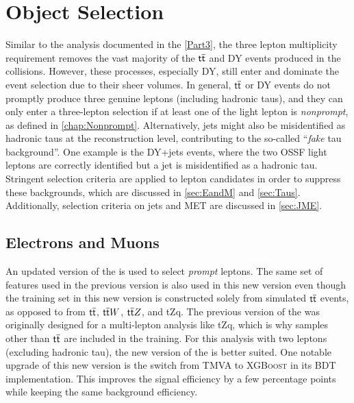 \chapter{Object Selection}
\label{chap:Obj}

Similar to the analysis documented in the \autoref{Part3}, the three lepton multiplicity requirement removes the vast majority of the $\textsf{t}\overline{\textsf{t}}$ and \ac{DY} events produced in the collisions. However, these processes, especially \ac{DY}, still enter and dominate the event selection due to their sheer volumes. In general, $\textsf{t}\overline{\textsf{t}}$ or \ac{DY} events do not promptly produce three genuine leptons (including hadronic taus), and they can only enter a three-lepton selection if at least one of the light lepton is \emph{nonprompt}, as defined in \autoref{chap:Nonprompt}. Alternatively, jets might also be misidentified as hadronic taus at the reconstruction level, contributing to the so-called ``\emph{fake} tau background''. One example is the \ac{DY}+jets events, where the two \ac{OSSF} light leptons are correctly identified but a jet is misidentified as a hadronic tau. Stringent selection criteria are applied to lepton candidates in order to suppress these backgrounds, which are discussed in \autoref{sec:EandM} and \autoref{sec:Taus}. Additionally, selection criteria on jets and \ac{MET} are discussed in \autoref{sec:JME}.

\section{Electrons and Muons}
\label{sec:EandM}

An updated version of the \TOP\cite{CMS:2023ftu} is used to select \emph{prompt} leptons. The same set of features used in the previous version is also used in this new version even though the training set in this new version is constructed solely from simulated $\textsf{t}\overline{\textsf{t}}$ events, as opposed to from $\textsf{t}\overline{\textsf{t}}$, $\textsf{t}\overline{\textsf{t}} W$, $\textsf{t}\overline{\textsf{t}} Z$, and tZq. The previous version of the \TOP was originally designed for a multi-lepton analysis like tZq, which is why samples other than $\textsf{t}\overline{\textsf{t}}$ are included in the training. For this analysis with two leptons (excluding hadronic tau), the new version of the \TOP is better suited. One notable upgrade of this new version is the switch from TMVA \cite{TMVA:2007ngy} to \textsc{XGBoost} \cite{Chen:2016:XST:2939672.2939785} in its \ac{BDT} implementation. This improves the signal efficiency by a few percentage points while keeping the same background efficiency. 

